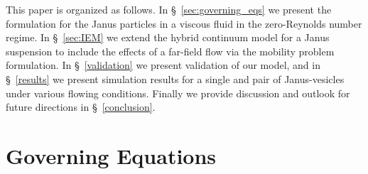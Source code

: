 \documentclass[lineno]{jfm}
\begin{document}
This paper is organized as follows. In \S~\ref{sec:governing_eqs} we
present the formulation for the Janus particles in a viscous fluid in
the zero-Reynolds number regime. In \S~\ref{sec:IEM} we extend the
hybrid continuum model for a Janus suspension to include the effects of
a far-field flow via the mobility problem formulation. In
\S~\ref{validation} we present validation of our model, and in
\S~\ref{results} we present simulation results for a single and pair of
Janus-vesicles under various flowing conditions. Finally we provide
discussion and outlook for future directions in \S~\ref{conclusion}.

\section{Governing Equations\label{sec:governing_eqs}}
\end{document}
